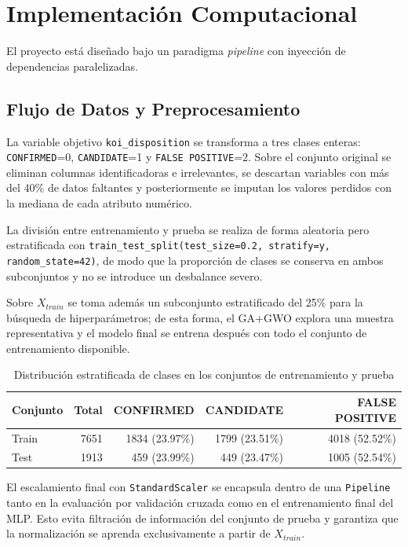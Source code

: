 \documentclass[12pt, letterpaper]{article}
\begin{document}
\section{Implementación Computacional}

El proyecto está diseñado bajo un paradigma \textit{pipeline} con inyección de dependencias paralelizadas.

\subsection{Flujo de Datos y Preprocesamiento}
La variable objetivo \texttt{koi\_disposition} se transforma a tres clases enteras: \texttt{CONFIRMED}=0, \texttt{CANDIDATE}=1 y \texttt{FALSE POSITIVE}=2. Sobre el conjunto original se eliminan columnas identificadoras e irrelevantes, se descartan variables con más del 40\% de datos faltantes y posteriormente se imputan los valores perdidos con la mediana de cada atributo numérico.

La división entre entrenamiento y prueba se realiza de forma aleatoria pero estratificada con \texttt{train\_test\_split(test\_size=0.2, stratify=y, random\_state=42)}, de modo que la proporción de clases se conserva en ambos subconjuntos y no se introduce un desbalance severo.

Sobre \(X_{train}\) se toma además un subconjunto estratificado del 25\% para la búsqueda de hiperparámetros; de esta forma, el GA+GWO explora una muestra representativa y el modelo final se entrena después con todo el conjunto de entrenamiento disponible.

\begin{table}[H]
    \centering
    \caption{Distribución estratificada de clases en los conjuntos de entrenamiento y prueba}
    \label{tab:split_distribution}
    \begin{tabular}{@{}lrrrr@{}}
        \toprule
        \textbf{Conjunto} & \textbf{Total} & \textbf{CONFIRMED} & \textbf{CANDIDATE} & \textbf{FALSE POSITIVE} \\ \midrule
        Train & 7651 & 1834 (23.97\%) & 1799 (23.51\%) & 4018 (52.52\%) \\
        Test  & 1913 & 459 (23.99\%) & 449 (23.47\%) & 1005 (52.54\%) \\
        \bottomrule
    \end{tabular}
\end{table}

El escalamiento final con \texttt{StandardScaler} se encapsula dentro de una \texttt{Pipeline} tanto en la evaluación por validación cruzada como en el entrenamiento final del MLP. Esto evita filtración de información del conjunto de prueba y garantiza que la normalización se aprenda exclusivamente a partir de \(X_{train}\).
\end{document}
